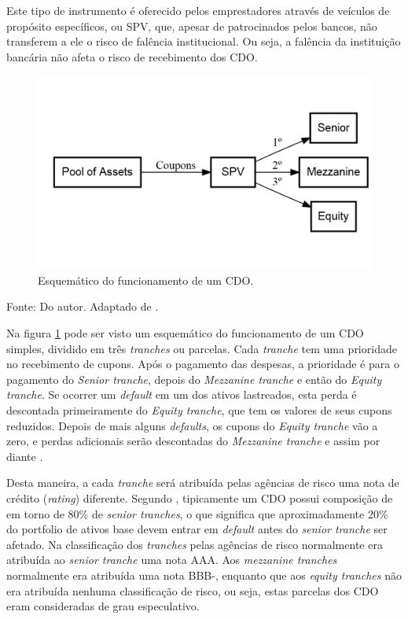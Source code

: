 \documentclass[
	12pt,				%
	oneside,			%
	a4paper,			%
	chapter=TITLE,		%
	section=TITLE,		%
	english,			%
	brazil				%
	]{abntex2}
\newcommand{\bcenter}{\begin{center}}
\newcommand{\ecenter}{\end{center}}
\begin{document}
Este tipo de instrumento é oferecido pelos emprestadores através de
veículos de propósito específicos, ou \gls{SPV}, que, apesar de
patrocinados pelos bancos, não transferem a ele o risco de falência
institucional. Ou seja, a falência da instituição bancária não afeta o
risco de recebimento dos \gls{CDO}.
\begin{figure}[H]

{\centering \includegraphics[width=0.7\linewidth]{images/CDO-1} 

}

\caption{Esquemático do funcionamento de um CDO.}\label{fig:CDO}
\end{figure}
\bcenter
Fonte: Do autor. Adaptado de \textcite{devil}. \ecenter

Na figura \ref{fig:CDO} pode ser visto um esquemático do funcionamento
de um CDO simples, dividido em três \emph{tranches} ou parcelas. Cada
\emph{tranche} tem uma prioridade no recebimento de cupons. Após o
pagamento das despesas, a prioridade é para o pagamento do \emph{Senior
tranche}, depois do \emph{Mezzanine tranche} e então do \emph{Equity
tranche}. Se ocorrer um \emph{default} em um dos ativos lastreados, esta
perda é descontada primeiramente do \emph{Equity tranche}, que tem os
valores de seus cupons reduzidos. Depois de mais alguns \emph{defaults},
os cupons do \emph{Equity tranche} vão a zero, e perdas adicionais serão
descontadas do \emph{Mezzanine tranche} e assim por diante
\autocite[6]{devil}.

Desta maneira, a cada \emph{tranche} será atribuída pelas agências de
risco uma nota de crédito (\emph{rating}) diferente. Segundo
\textcite{devil}, tipicamente um \gls{CDO} possui composição de em torno
de 80\% de \emph{senior tranches}, o que significa que aproximadamente
20\% do portfolio de ativos base devem entrar em \emph{default} antes do
\emph{senior tranche} ser afetado. Na classificação dos \emph{tranches}
pelas agências de risco normalmente era atribuída ao \emph{senior
tranche} uma nota AAA. Aos \emph{mezzanine tranches} normalmente era
atribuída uma nota BBB-, enquanto que aos \emph{equity tranches} não era
atribuída nenhuma classificação de risco, ou seja, estas parcelas dos
\gls{CDO} eram consideradas de grau especulativo.
\end{document}
